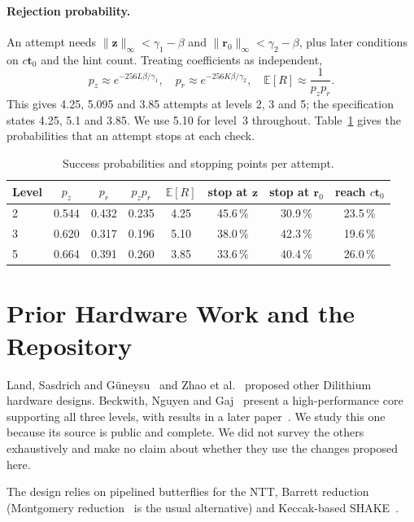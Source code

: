 \documentclass[12pt,a4paper]{report}
\begin{document}
\paragraph{Rejection probability.}
An attempt needs $\|\mathbf{z}\|_\infty<\gamma_1-\beta$ and $\|\mathbf{r}_0\|_\infty<\gamma_2-\beta$, plus later conditions on $c\mathbf{t}_0$ and the hint count. Treating coefficients as independent,
\begin{equation}
  p_z\approx e^{-256L\beta/\gamma_1},\quad
  p_r\approx e^{-256K\beta/\gamma_2},\quad
  \mathbb{E}[R]\approx \frac{1}{p_zp_r}.
  \label{eq:rep}
\end{equation}
This gives 4.25, 5.095 and 3.85 attempts at levels 2, 3 and 5; the specification states 4.25, 5.1 and 3.85. We use 5.10 for level~3 throughout. Table~\ref{tab:prob} gives the probabilities that an attempt stops at each check.

\begin{table}[H]
\centering
\caption{Success probabilities and stopping points per attempt.}\label{tab:prob}
\begin{tabular}{@{}lccccccc@{}}
\toprule
Level & $p_z$ & $p_r$ & $p_zp_r$ & $\mathbb{E}[R]$ & stop at $\mathbf{z}$ & stop at $\mathbf{r}_0$ & reach $c\mathbf{t}_0$\\
\midrule
2 & 0.544 & 0.432 & 0.235 & 4.25 & 45.6\,\% & 30.9\,\% & 23.5\,\%\\
3 & 0.620 & 0.317 & 0.196 & 5.10 & 38.0\,\% & 42.3\,\% & 19.6\,\%\\
5 & 0.664 & 0.391 & 0.260 & 3.85 & 33.6\,\% & 40.4\,\% & 26.0\,\%\\
\bottomrule
\end{tabular}
\end{table}

\section{Prior Hardware Work and the Repository}
Land, Sasdrich and G\"uneysu~\cite{land2021} and Zhao et al.~\cite{zhao2022} proposed other Dilithium hardware designs. Beckwith, Nguyen and Gaj~\cite{beckwith2021} present a high-performance core supporting all three levels, with results in a later paper~\cite{beckwith2022}. We study this one because its source is public and complete. We did not survey the others exhaustively and make no claim about whether they use the changes proposed here.

The design relies on pipelined butterflies for the NTT, Barrett reduction~\cite{barrett1986} (Montgomery reduction~\cite{montgomery1985} is the usual alternative) and Keccak-based SHAKE~\cite{fips202}.
\end{document}
